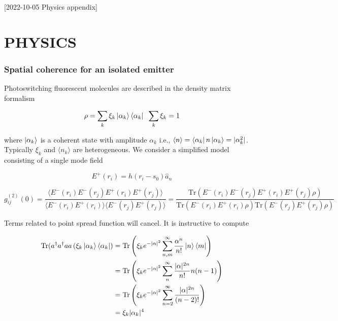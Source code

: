 [2022-10-05 Physics appendix]

\chapter{PHYSICS}

\subsection{Spatial coherence for an isolated emitter}

Photoswitching fluorescent molecules are described in the density matrix formalism

\begin{equation*}
\rho = \sum_{k}\xi_{k}\ket{\alpha_{k}}\bra{\alpha_{k}}\;\; \sum_{k}\xi_{k} = 1
\end{equation*}


where $\ket{\alpha_{k}}$ is a coherent state with amplitude $\alpha_{k}$ i.e., $\langle n\rangle = \bra{\alpha_{k}} n\ket{\alpha_{k}} = \lvert\alpha_{k}^{2}\rvert$. Typically $\xi_{k}$ and $\langle n_{k}\rangle$ are heterogeneous. We consider a simplified model consisting of a single mode field 

\begin{equation*}
E^{+}(r_{i}) = h(r_{i}-s_{0})\hat{a}_{n}
\end{equation*}

\begin{equation*}
g^{(2)}_{ij}(0) = \frac{\langle E^{-}(r_{i})E^{-}(r_{j})E^{+}(r_{i})E^{+}(r_{j}) \rangle}{\langle E^{-}(r_{i})E^{+}(r_{i})\rangle\langle E^{-}(r_{j})E^{+}(r_{j})\rangle} = \frac{\mathrm{Tr}(E^{-}(r_{i})E^{-}(r_{j})E^{+}(r_{i})E^{+}(r_{j})\rho)}{\mathrm{Tr}(E^{-}(r_{i})E^{+}(r_{i})\rho)\mathrm{Tr}(E^{-}(r_{j})E^{+}(r_{j})\rho)}
\end{equation*}

Terms related to point spread function will cancel. It is instructive to compute

\begin{align*}
\mathrm{Tr}(a^{\dagger}a^{\dagger}aa \left(\xi_{k}\ket{\alpha_{k}}\bra{\alpha_{k}}\right) &= \mathrm{Tr}\left(\xi_{k} e^{-\lvert\alpha\rvert^{2}}\sum_{n,m}^{\infty}\frac{\alpha^{n}}{n!}\ket{n}\bra{m}\right)\\
&= \mathrm{Tr}\left(\xi_{k} e^{-\lvert\alpha\rvert^{2}}\sum_{n}^{\infty}\frac{\lvert\alpha\rvert^{2n}}{n!}n(n-1)\right)\\
&= \mathrm{Tr}\left(\xi_{k} e^{-\lvert\alpha\rvert^{2}}\sum_{n=2}^{\infty}\frac{\lvert\alpha\rvert^{2n}}{(n-2)!}\right)\\
&= \xi_{k}\lvert\alpha_{k}\rvert^{4}
\end{align*}

